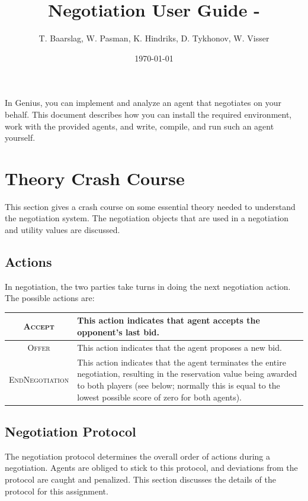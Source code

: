 \documentclass[]{article}
\title{Negotiation User Guide - \ANAC{ANAC Version}\AI{AI Techniques (IN4010TU) Version}}
\author{T. Baarslag, W. Pasman, K. Hindriks, D. Tykhonov, W. Visser}
\date{\today}
\begin{document}
\ifpdf
{}
\else
{}
\fi

\maketitle

\newcommand\Genius{{\sc Genius}}

In Genius, you can implement and analyze an agent that negotiates on your behalf. This document describes how you can install the required environment, work with the provided agents, and write, compile, and run such an agent yourself.

\tableofcontents

\section{Theory Crash Course}
This section gives a crash course on some essential theory needed to understand the negotiation system. The negotiation objects that are used in a negotiation and utility values are discussed. 

\subsection{Actions}
In negotiation, the two parties take turns in doing the next negotiation action. The possible actions are:

\begin{center}
\begin{tabular}{cm{}}
\hline
\textsc{Accept} & This action indicates that agent accepts the opponent's last bid.\\
\hline
\textsc{Offer} & This action indicates that the agent proposes a new bid.\\
\hline
\textsc{EndNegotiation} & This action indicates that the agent terminates the entire negotiation, resulting in the reservation value being awarded to both players (see below; normally this is equal to the lowest possible score of zero for both agents).\\
\hline
\end{tabular}
\end{center}

\subsection{Negotiation Protocol}
The negotiation protocol determines the overall order of actions during a negotiation. Agents are obliged to stick to this protocol, and deviations from the protocol are caught and penalized. This section discusses the details of the protocol for this assignment.
\end{document}
